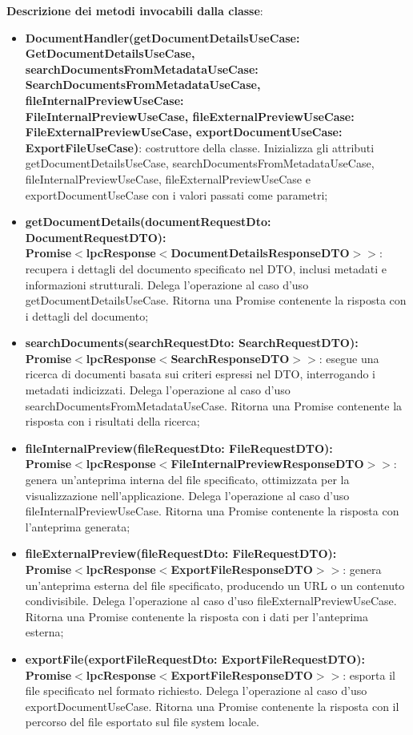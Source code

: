 \documentclass[a4paper,12pt]{article}
\begin{document}
{{            \noindent \textbf{Descrizione dei metodi invocabili dalla classe}:
                \begin{itemize}
                    \item \textbf{DocumentHandler(getDocumentDetailsUseCase:\\ GetDocumentDetailsUseCase, searchDocumentsFromMetadataUseCase:\\ SearchDocumentsFromMetadataUseCase, fileInternalPreviewUseCase:\\ FileInternalPreviewUseCase, fileExternalPreviewUseCase:\\ FileExternalPreviewUseCase, exportDocumentUseCase:\\ ExportFileUseCase)}: costruttore della classe. Inizializza gli attributi getDocumentDetailsUseCase, searchDocumentsFromMetadataUseCase, fileInternalPreviewUseCase, fileExternalPreviewUseCase e exportDocumentUseCase con i valori passati come parametri;
                    \item \textbf{getDocumentDetails(documentRequestDto: DocumentRequestDTO):\\ Promise$<$lpcResponse$<$DocumentDetailsResponseDTO$>>$}: recupera i dettagli del documento specificato nel DTO, inclusi metadati e informazioni strutturali. Delega l'operazione al caso d'uso getDocumentDetailsUseCase. Ritorna una Promise contenente la risposta con i dettagli del documento;
                    \item \textbf{searchDocuments(searchRequestDto: SearchRequestDTO):\\ Promise$<$lpcResponse$<$SearchResponseDTO$>>$}: esegue una ricerca di documenti basata sui criteri espressi nel DTO, interrogando i metadati indicizzati. Delega l'operazione al caso d'uso searchDocumentsFromMetadataUseCase. Ritorna una Promise contenente la risposta con i risultati della ricerca;
                    \item \textbf{fileInternalPreview(fileRequestDto: FileRequestDTO):\\ Promise$<$lpcResponse$<$FileInternalPreviewResponseDTO$>>$}: genera un'anteprima interna del file specificato, ottimizzata per la visualizzazione nell'applicazione. Delega l'operazione al caso d'uso fileInternalPreviewUseCase. Ritorna una Promise contenente la risposta con l'anteprima generata;
                    \item \textbf{fileExternalPreview(fileRequestDto: FileRequestDTO):\\ Promise$<$lpcResponse$<$ExportFileResponseDTO$>>$}: genera un'anteprima esterna del file specificato, producendo un URL o un contenuto condivisibile. Delega l'operazione al caso d'uso fileExternalPreviewUseCase. Ritorna una Promise contenente la risposta con i dati per l'anteprima esterna;
                    \item \textbf{exportFile(exportFileRequestDto: ExportFileRequestDTO):\\ Promise$<$lpcResponse$<$ExportFileResponseDTO$>>$}: esporta il file specificato nel formato richiesto. Delega l'operazione al caso d'uso exportDocumentUseCase. Ritorna una Promise contenente la risposta con il percorso del file esportato sul file system locale.
                \end{itemize}

}}
\end{document}
